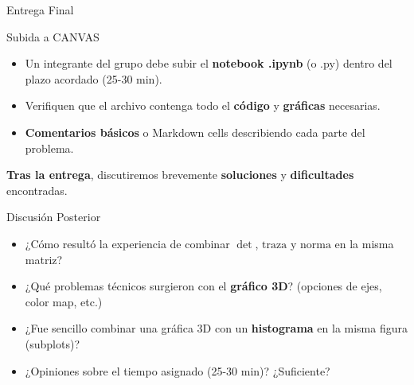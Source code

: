 \documentclass[10pt]{beamer}
\begin{document}
\begin{frame}{Entrega Final}
  \begin{block}{Subida a CANVAS}
    \begin{itemize}
      \item Un integrante del grupo debe subir el \textbf{notebook .ipynb} (o .py) dentro del plazo acordado (25-30 min).
      \item Verifiquen que el archivo contenga todo el \textbf{código} y \textbf{gráficas} necesarias.
      \item \textbf{Comentarios básicos} o Markdown cells describiendo cada parte del problema.
    \end{itemize}
  \end{block}
  \vspace{0.3cm}
  \textbf{Tras la entrega}, discutiremos brevemente \textbf{soluciones} y \textbf{dificultades} encontradas.
\end{frame}

\begin{frame}{Discusión Posterior}
  \begin{itemize}
    \item ¿Cómo resultó la experiencia de combinar \(\det\), \(\text{traza}\) y \(\text{norma}\) en la misma matriz?
    \item ¿Qué problemas técnicos surgieron con el \textbf{gráfico 3D}? (opciones de ejes, color map, etc.)
    \item ¿Fue sencillo combinar una gráfica 3D con un \textbf{histograma} en la misma figura (subplots)?
    \item ¿Opiniones sobre el tiempo asignado (25-30 min)? ¿Suficiente?
  \end{itemize}
\end{frame}
\end{document}
